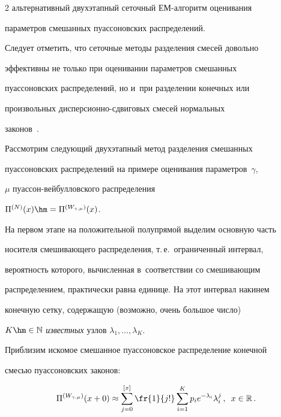 \begin{multicols}{2}
альтернативный двухэтапный сеточный ЕМ-ал\-го\-ритм оценивания


параметров смешанных пуассоновских распределений.





Следует отметить, что сеточные методы разделения смесей довольно


эффективны не только при оценивании параметров смешанных


пуассоновских распределений, но и~при разделении конечных или


произвольных дис\-пер\-си\-он\-но-сдви\-го\-вых смесей нормальных 


законов~\cite{KorolevKorchagin2014}.





Рассмотрим следующий двухэтапный метод разделения смешанных


пуассоновских распределений на примере оценивания параметров~$\gamma$, 


$\mu$ пу\-ас\-сон-вей\-бул\-лов\-ско\-го распределения


$\Pi^{(N)}(x)\hm=\Pi^{(W_{\gamma,\mu})}(x)$.





На первом этапе на положительной полупрямой выделим основную часть


носителя смешивающего распределения, т.\,е.\ ограниченный интервал,


вероятность которого, вычисленная в~соответствии со смешивающим


распределением, практически равна единице. На этот интервал накинем


конечную сетку, содержащую (возможно, очень большое чис\-ло)


$K\hm\in\mathbb{N}$ \textit{известных} узлов $\lambda_1,\ldots,\lambda_K$.


Приблизим искомое смешанное пуассоновское распределение конечной


смесью пуассоновских законов:


\begin{equation}


\Pi^{(W_{\gamma,\mu})}(x+0)\approx\sum\limits_{j=0}^{[x]}


\fr{1}{j!}\sum\limits_{i=1}^K p_i e^{-\lambda_i}\lambda_i^j\,,\enskip


x\in\mathbb{R}\,.


\label{e2-kk}



\end{equation}
\end{multicols}
